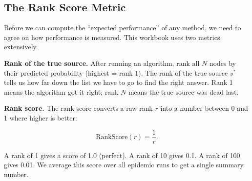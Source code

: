 \subsection{The Rank Score Metric}

Before we can compute the ``expected performance'' of any method, we need to agree on
how performance is measured. This workbook uses two metrics extensively.

\textbf{Rank of the true source.} After running an algorithm, rank all $N$ nodes by
their predicted probability (highest = rank 1). The rank of the true source $s^*$
tells us how far down the list we have to go to find the right answer. Rank 1 means
the algorithm got it right; rank $N$ means the true source was dead last.

\textbf{Rank score.} The rank score converts a raw rank $r$ into a number between 0
and 1 where higher is better:

\begin{equation}
  \text{RankScore}(r) = \frac{1}{r}.
  \label{eq:rank-score}
\end{equation}

A rank of 1 gives a score of 1.0 (perfect). A rank of 10 gives 0.1. A rank of 100
gives 0.01. We average this score over all epidemic runs to get a single summary number.

